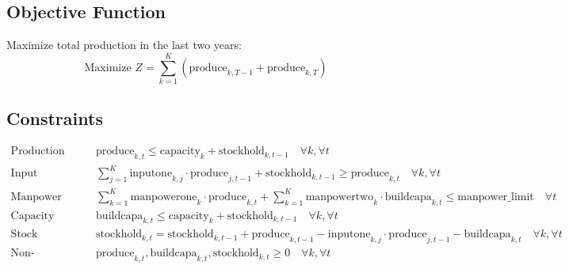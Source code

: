 \documentclass{article}
\begin{document}
\subsection*{Objective Function}
Maximize total production in the last two years:
\[
\text{Maximize } Z = \sum_{k=1}^{K} \left( \text{produce}_{k,T-1} + \text{produce}_{k,T} \right)
\]

\subsection*{Constraints}
\begin{align}
    \text{Production Constraint:} & \quad \text{produce}_{k,t} \leq \text{capacity}_{k} + \text{stockhold}_{k,t-1} \quad \forall k, \forall t \\
    \text{Input Requirement:} & \quad \sum_{j=1}^{K} \text{inputone}_{k,j} \cdot \text{produce}_{j,t-1} + \text{stockhold}_{k,t-1} \geq \text{produce}_{k,t} \quad \forall k, \forall t \\
    \text{Manpower Constraint:} & \quad \sum_{k=1}^{K} \text{manpowerone}_{k} \cdot \text{produce}_{k,t} + \sum_{k=1}^{K} \text{manpowertwo}_{k} \cdot \text{buildcapa}_{k,t} \leq \text{manpower\_limit} \quad \forall t \\
    \text{Capacity Building:} & \quad \text{buildcapa}_{k,t} \leq \text{capacity}_{k} + \text{stockhold}_{k,t-1} \quad \forall k, \forall t \\
    \text{Stock Dynamics:} & \quad \text{stockhold}_{k,t} = \text{stockhold}_{k,t-1} + \text{produce}_{k,t-1} - \text{inputone}_{k,j} \cdot \text{produce}_{j,t-1} - \text{buildcapa}_{k,t} \quad \forall k, \forall t \\
    \text{Non-negativity:} & \quad \text{produce}_{k,t}, \text{buildcapa}_{k,t}, \text{stockhold}_{k,t} \geq 0 \quad \forall k, \forall t
\end{align}
\end{document}
